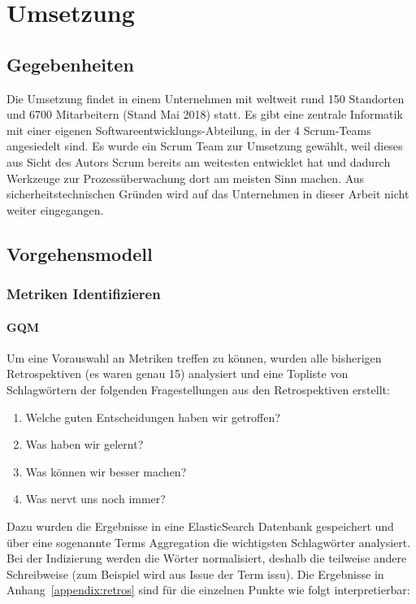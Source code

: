 \chapter{Umsetzung}

\section{Gegebenheiten}

Die Umsetzung findet in einem Unternehmen mit weltweit rund 150 Standorten und 6700 Mitarbeitern (Stand Mai 2018) statt.
Es gibt eine zentrale Informatik mit einer eigenen Softwareentwicklungs-Abteilung, in der 4 Scrum-Teams angesiedelt sind.
Es wurde ein Scrum Team zur Umsetzung gewählt, weil dieses aus Sicht des Autors Scrum bereits am weitesten entwicklet hat und dadurch Werkzeuge zur Prozessüberwachung dort am meisten Sinn machen.
Aus sicherheitstechnischen Gründen wird auf das Unternehmen in dieser Arbeit nicht weiter eingegangen.

\section{Vorgehensmodell}

\subsection{Metriken Identifizieren}

\subsubsection{\ac{GQM}}

Um eine Vorauswahl an Metriken treffen zu können, wurden alle bisherigen Retrospektiven (es waren genau 15) analysiert und eine Topliste von Schlagwörtern der folgenden Fragestellungen aus den Retrospektiven erstellt:
\begin{enumerate}
    \item Welche guten Entscheidungen haben wir getroffen?
    \item Was haben wir gelernt?
    \item Was können wir besser machen?
    \item Was nervt uns noch immer?
\end{enumerate}

Dazu wurden die Ergebnisse in eine ElasticSearch Datenbank gespeichert und über eine sogenannte Terms Aggregation die wichtigsten Schlagwörter analysiert.
Bei der Indizierung werden die Wörter normalisiert, deshalb die teilweise andere Schreibweise (zum Beispiel wird aus Issue der Term issu).
Die Ergebnisse in Anhang~\ref{appendix:retros} sind für die einzelnen Punkte wie folgt interpretierbar:

